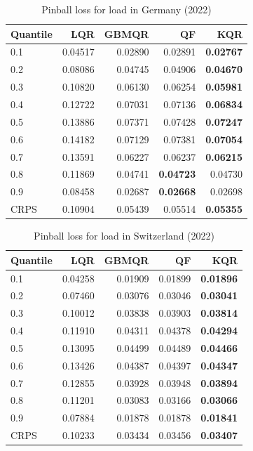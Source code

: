 \begin{table}[!ht]
    \centering
    \caption{Pinball loss for load in Germany (2022)}
    \label{tab:energy_chart_de}
    \begin{tabular}{lrrrr}
    \toprule
    Quantile & LQR & GBMQR & QF & KQR \\
    \midrule
    0.1 & 0.04517 & 0.02890 & 0.02891 & \textbf{0.02767} \\
    0.2 & 0.08086 & 0.04745 & 0.04906 & \textbf{0.04670} \\
    0.3 & 0.10820 & 0.06130 & 0.06254 & \textbf{0.05981} \\
    0.4 & 0.12722 & 0.07031 & 0.07136 & \textbf{0.06834} \\
    0.5 & 0.13886 & 0.07371 & 0.07428 & \textbf{0.07247} \\
    0.6 & 0.14182 & 0.07129 & 0.07381 & \textbf{0.07054} \\
    0.7 & 0.13591 & 0.06227 & 0.06237 & \textbf{0.06215} \\
    0.8 & 0.11869 & 0.04741 & \textbf{0.04723} & 0.04730 \\
    0.9 & 0.08458 & 0.02687 & \textbf{0.02668} & 0.02698 \\
    \midrule
    CRPS & 0.10904 & 0.05439 & 0.05514 & \textbf{0.05355} \\
    \bottomrule
    \end{tabular}
    \end{table}
    


\begin{table}[!ht]
\centering
    \caption{Pinball loss for load in Switzerland (2022)}
    \label{tab:energy_chart_ch}
    \begin{tabular}{lrrrr}
    \toprule
    Quantile & LQR & GBMQR & QF & KQR\\
    \midrule
    0.1 & 0.04258 & 0.01909 & 0.01899 & \textbf{0.01896} \\
    0.2 & 0.07460 & 0.03076 & 0.03046 & \textbf{0.03041} \\
    0.3 & 0.10012 & 0.03838 & 0.03903 & \textbf{0.03814} \\
    0.4 & 0.11910 & 0.04311 & 0.04378 & \textbf{0.04294} \\
    0.5 & 0.13095 & 0.04499 & 0.04489 & \textbf{0.04466} \\
    0.6 & 0.13426 & 0.04387 & 0.04397 & \textbf{0.04347} \\
    0.7 & 0.12855 & 0.03928 & 0.03948 & \textbf{0.03894} \\
    0.8 & 0.11201 & 0.03083 & 0.03166 & \textbf{0.03066} \\
    0.9 & 0.07884 & 0.01878 & 0.01878 & \textbf{0.01841} \\
    \midrule
    CRPS & 0.10233 & 0.03434 & 0.03456 & \textbf{0.03407} \\
    \bottomrule
    \end{tabular}
    \end{table}


